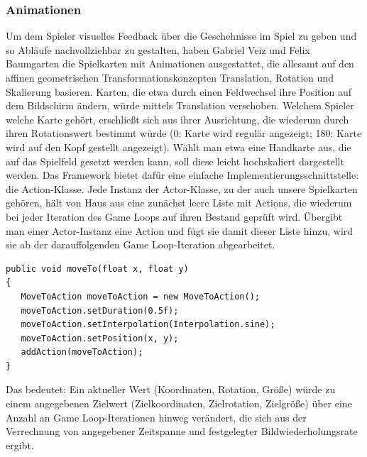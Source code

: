 \subsubsection{Animationen}
Um dem Spieler visuelles Feedback über die Geschehnisse im Spiel zu geben und so Abläufe nachvollziehbar zu gestalten, haben Gabriel Veiz und Felix Baumgarten die Spielkarten mit Animationen ausgestattet, die allesamt auf den affinen geometrischen Transformationskonzepten Translation, Rotation und Skalierung basieren.
Karten, die etwa durch einen Feldwechsel ihre Position auf dem Bildschirm ändern, würde mittels Translation verschoben. Welchem Spieler welche Karte gehört, erschließt sich aus ihrer Ausrichtung, die wiederum durch ihren Rotationswert bestimmt würde (0: Karte wird regulär angezeigt; 180: Karte wird auf den Kopf gestellt angezeigt). Wählt man etwa eine Handkarte aus, die auf das Spielfeld gesetzt werden kann, soll diese leicht hochskaliert dargestellt werden. Das Framework bietet dafür eine einfache Implementierungsschnittstelle: die Action-Klasse.
Jede Instanz der Actor-Klasse, zu der auch unsere Spielkarten gehören, hält von Haus aus eine zunächst leere Liste mit Actions, die wiederum bei jeder Iteration des Game Loops auf ihren Bestand geprüft wird. Übergibt man einer Actor-Instanz eine Action und fügt sie damit dieser Liste hinzu, wird sie ab der darauffolgenden Game Loop-Iteration abgearbeitet.
\begin{lstlisting}
public void moveTo(float x, float y)
{
   MoveToAction moveToAction = new MoveToAction();
   moveToAction.setDuration(0.5f);
   moveToAction.setInterpolation(Interpolation.sine);
   moveToAction.setPosition(x, y);
   addAction(moveToAction);
}
\end{lstlisting}
Das bedeutet: Ein aktueller Wert (Koordinaten, Rotation, Größe) würde zu einem angegebenen Zielwert (Zielkoordinaten, Zielrotation, Zielgröße) über eine Anzahl an Game Loop-Iterationen hinweg verändert, die sich aus der Verrechnung von angegebener Zeitspanne und festgelegter Bildwiederholungsrate ergibt.

